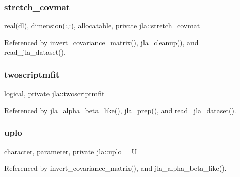 \mbox{\label{namespacejla_a7244bc3fbb6a94e6d1fe9d0e1fbaaef8}} 
\subsubsection{\texorpdfstring{stretch\+\_\+covmat}{stretch\_covmat}}
{\footnotesize\ttfamily real(\mbox{\hyperlink{namespacejla_a3aa6435b4e08f1d532390186ac608741}{dl}}), dimension(\+:,\+:), allocatable, private jla\+::stretch\+\_\+covmat\hspace{0.3cm}{\ttfamily [private]}}



Referenced by invert\+\_\+covariance\+\_\+matrix(), jla\+\_\+cleanup(), and read\+\_\+jla\+\_\+dataset().

\mbox{\label{namespacejla_a6aade81a34ccb4e5795d2141aeace91d}} 
\subsubsection{\texorpdfstring{twoscriptmfit}{twoscriptmfit}}
{\footnotesize\ttfamily logical, private jla\+::twoscriptmfit\hspace{0.3cm}{\ttfamily [private]}}



Referenced by jla\+\_\+alpha\+\_\+beta\+\_\+like(), jla\+\_\+prep(), and read\+\_\+jla\+\_\+dataset().

\mbox{\label{namespacejla_ae9dda5d2cfb1fec80f10dea135ea407e}} 
\subsubsection{\texorpdfstring{uplo}{uplo}}
{\footnotesize\ttfamily character, parameter, private jla\+::uplo = \textquotesingle{}U\textquotesingle{}\hspace{0.3cm}{\ttfamily [private]}}



Referenced by invert\+\_\+covariance\+\_\+matrix(), and jla\+\_\+alpha\+\_\+beta\+\_\+like().

